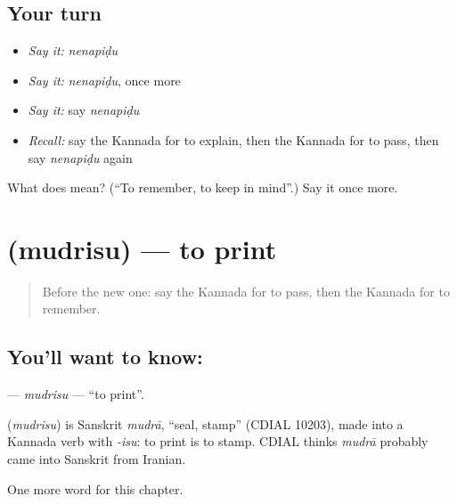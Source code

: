 \subsection*{Your turn}
\begin{itemize}
\raggedright
  \item \emph{Say it:} \emph{nenapiḍu}
  \item \emph{Say it:} \emph{nenapiḍu}, once more
  \item \emph{Say it:} say \emph{nenapiḍu}
  \item \emph{Recall:} say the Kannada for to explain, then the Kannada for to pass, then say \emph{nenapiḍu} again
\end{itemize}

\begin{tcolorbox}[breakable,colback=teal!4,colframe=teal!35!black,title={Before you move on}]
What does  mean? (\textquotedblleft{}To remember, to keep in mind\textquotedblright{}.) Say it once more.
\end{tcolorbox}
\section[\texorpdfstring{\kn{ಮುದ್ರಿಸು} (mudrisu)}{ಮುದ್ರಿಸು (mudrisu)}]{ (mudrisu) — to print}

\label{lesson:KA-C201-mudrisu}



\begin{quote}
Before the new one: say the Kannada for to pass, then the Kannada for to remember.
\end{quote}

\subsection*{You'll want to know: }
\textbf{} — \emph{mudrisu} — \textquotedblleft{}to print\textquotedblright{}.

\begin{cousinweb}
\textbf{} (\emph{mudrisu}) is Sanskrit \emph{mudrā}, \textquotedblleft{}seal, stamp\textquotedblright{} (CDIAL 10203), made into a Kannada verb with \emph{-isu}: to print is to stamp. CDIAL thinks \emph{mudrā} probably came into Sanskrit from Iranian.
\end{cousinweb}

\begin{grammarlens}[title={What you've built}]
One more word for this chapter.
\end{grammarlens}


